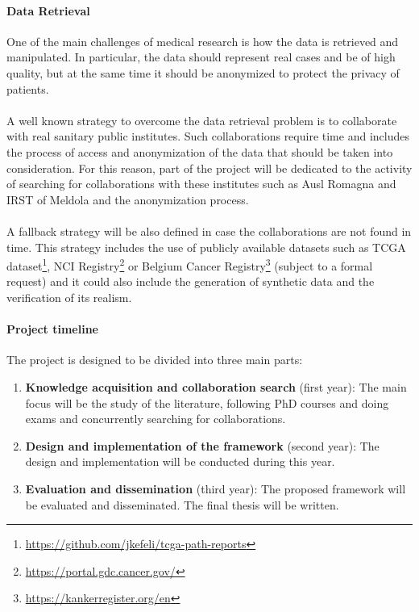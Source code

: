\documentclass[11pt]{scrartcl}
\begin{document}
\paragraph{Data Retrieval}{One of the main challenges of medical research is how the data is retrieved and manipulated. 
In particular, the data should represent real cases and be of high quality, but at the same time it should be anonymized to protect the privacy of patients.   
\\\\
A well known strategy to overcome the data retrieval problem is to collaborate with real sanitary public institutes. Such collaborations require time and includes the process of access and anonymization of the data that should be taken into consideration. For this reason, part of the project will be dedicated to the activity of searching for collaborations with these institutes such as Ausl Romagna and IRST of Meldola and the anonymization process.
\\\\
A fallback strategy will be also defined in case the collaborations are not found in time. This strategy includes the use of publicly available datasets such as TCGA dataset\footnote{\url{https://github.com/jkefeli/tcga-path-reports}}, NCI Registry\footnote{\url{https://portal.gdc.cancer.gov/}} or Belgium Cancer Registry\footnote{\url{https://kankerregister.org/en}} (subject to a formal request) and it could also include the generation of synthetic data and the verification of its realism.
}

\paragraph{Project timeline}{The project is designed to be divided into three main parts:
\begin{enumerate}
    \item \textbf{Knowledge acquisition and collaboration search} (first year): The main focus will be the study of the literature, following PhD courses and doing exams and concurrently searching for collaborations.
    \item \textbf{Design and implementation of the framework} (second year): The design and implementation will be conducted during this year. 
    \item \textbf{Evaluation and dissemination} (third year): The proposed framework will be evaluated and disseminated. The final thesis will be written. 
\end{enumerate}}



\end{document}
